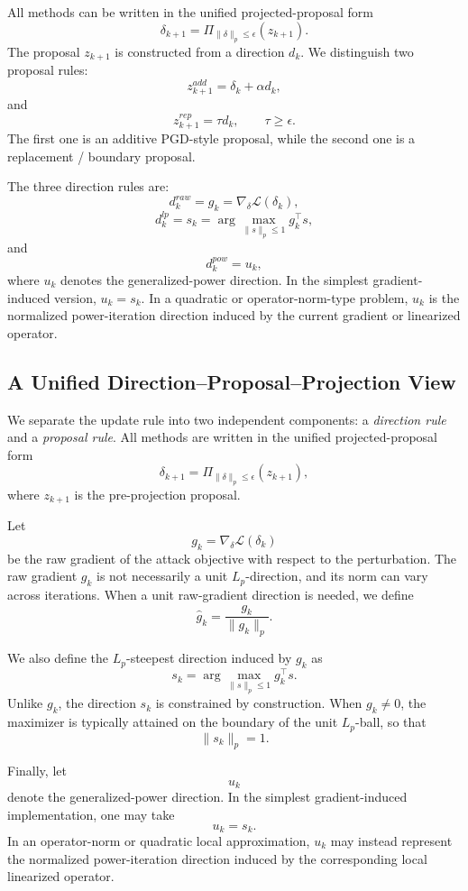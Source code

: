 \documentclass{article}
\begin{document}
All methods can be written in the unified projected-proposal form
\[
\delta_{k+1}
=
\Pi_{\|\delta\|_p\le\epsilon}(z_{k+1}).
\]
The proposal \(z_{k+1}\) is constructed from a direction \(d_k\). We distinguish two proposal rules:
\[
z_{k+1}^{add}
=
\delta_k+\alpha d_k,
\]
and
\[
z_{k+1}^{rep}
=
\tau d_k,
\qquad
\tau\ge \epsilon.
\]
The first one is an additive PGD-style proposal, while the second one is a replacement / boundary proposal.

The three direction rules are:
\[
d_k^{raw}
=
g_k
=
\nabla_\delta \mathcal L(\delta_k),
\]
\[
d_k^{lp}
=
s_k
=
\arg\max_{\|s\|_p\le1} g_k^\top s,
\]
and
\[
d_k^{pow}
=
u_k,
\]
where \(u_k\) denotes the generalized-power direction. In the simplest gradient-induced version, \(u_k=s_k\). In a quadratic or operator-norm-type problem, \(u_k\) is the normalized power-iteration direction induced by the current gradient or linearized operator.
\subsection{A Unified Direction--Proposal--Projection View}

We separate the update rule into two independent components: a \emph{direction rule} and a \emph{proposal rule}. 
All methods are written in the unified projected-proposal form
\[
\delta_{k+1}
=
\Pi_{\|\delta\|_p\le\epsilon}(z_{k+1}),
\]
where \(z_{k+1}\) is the pre-projection proposal.

Let
\[
g_k
=
\nabla_\delta \mathcal L(\delta_k)
\]
be the raw gradient of the attack objective with respect to the perturbation. The raw gradient \(g_k\) is not necessarily a unit \(L_p\)-direction, and its norm can vary across iterations. When a unit raw-gradient direction is needed, we define
\[
\widehat g_k
=
\frac{g_k}{\|g_k\|_p}.
\]

We also define the \(L_p\)-steepest direction induced by \(g_k\) as
\[
s_k
=
\arg\max_{\|s\|_p\le 1} g_k^\top s.
\]
Unlike \(g_k\), the direction \(s_k\) is constrained by construction. When \(g_k\neq 0\), the maximizer is typically attained on the boundary of the unit \(L_p\)-ball, so that
\[
\|s_k\|_p=1.
\]

Finally, let
\[
u_k
\]
denote the generalized-power direction. In the simplest gradient-induced implementation, one may take
\[
u_k=s_k.
\]
In an operator-norm or quadratic local approximation, \(u_k\) may instead represent the normalized power-iteration direction induced by the corresponding local linearized operator.
\end{document}
